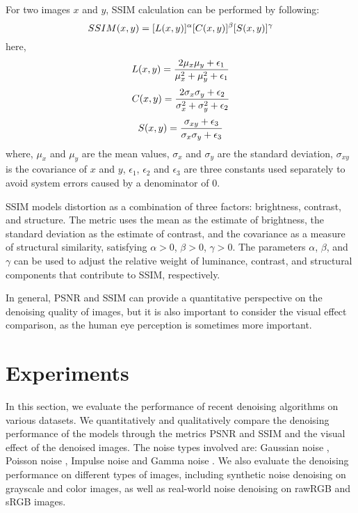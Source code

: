 \documentclass[conference]{IEEEtran}
\begin{document}
For two images $x$ and $y$, SSIM calculation can be performed by following:
\begin{equation}
	\setlength{\abovedisplayskip}{0pt}
	\setlength{\belowdisplayskip}{0pt}
	SSIM(x,y) = [L(x,y)]^{\alpha} [C(x,y)]^{\beta} [S(x,y)]^{\gamma}
	\label{eq:SSIM_1}
\end{equation}
here,
\begin{equation}
	\setlength{\abovedisplayskip}{0pt}
	\setlength{\belowdisplayskip}{0pt}
	L(x,y) = \frac{2 \mu_x \mu_y + \epsilon_1}{\mu_x^2+ \mu_y^2 +\epsilon_1}
	\label{eq:SSIM_2}
\end{equation}
\begin{equation}
	\setlength{\abovedisplayskip}{0pt}
	\setlength{\belowdisplayskip}{0pt}
	C(x,y) = \frac{2 \sigma_x \sigma_y + \epsilon_2}{\sigma_x^2 + \sigma_y^2 +\epsilon_2}
	\label{eq:SSIM_3}
\end{equation}
\begin{equation}
	\setlength{\abovedisplayskip}{0pt}
	\setlength{\belowdisplayskip}{0pt}
	S(x,y) = \frac{\sigma_{xy} + \epsilon_3}{\sigma_x \sigma_y +\epsilon_3}
	\label{eq:SSIM_4}
\end{equation}  
where, $\mu_x$ and $\mu_y$ are the mean values, $\sigma_x$ and $\sigma_y$ are the standard deviation, $\sigma_{xy}$ is the covariance of  $x$ and $y$, $\epsilon_1$, $\epsilon_2$ and $\epsilon_3$ are three constants used separately to avoid system errors caused by a denominator of 0.

SSIM models distortion as a combination of three factors: brightness, contrast, and structure. The metric uses the mean as the estimate of brightness, the standard deviation as the estimate of contrast, and the covariance as a measure of structural similarity, satisfying $\alpha >0$, $\beta >0$, $\gamma >0$. The parameters $\alpha$, $\beta$, and $\gamma$ can be used to adjust the relative weight of luminance, contrast, and structural components that contribute to SSIM, respectively.

In general, PSNR and SSIM can provide a quantitative perspective on the denoising quality of images, but it is also important to consider the visual effect comparison, as the human eye perception is sometimes more important.

\section{Experiments}
\label{sec:Section4}
\noindent In this section, we evaluate the performance of recent denoising algorithms on various datasets. We quantitatively and qualitatively compare the denoising performance of the models through the metrics PSNR \cite{hore2010image} and SSIM \cite{hore2010image} and the visual effect of the denoised images. The noise types involved are: Gaussian noise \cite{slepian1962one}, Poisson noise \cite{middleton1951theory}, Impulse noise \cite{henderson1986impulse} and Gamma noise \cite{schultz1964shutdown}. We also evaluate the denoising performance on different types of images, including synthetic noise denoising on grayscale and color images, as well as real-world noise denoising on rawRGB and sRGB images.
\end{document}
